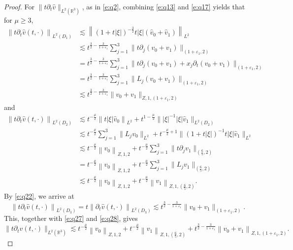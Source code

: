\documentclass[10pt,a4paper]{amsart}
\newcommand{\R}{\mathbb R}
\newcommand{\f}{\frac}
\newcommand{\p}{\partial}
\begin{document}
\begin{proof}
For $\|t\p_t\hat{v}\|_{L^2(\R^3)}$, as in \eqref{e:q2}, combining \eqref{e:q13} and \eqref{e:q17} yields that for $\mu\geq3$,
\begin{equation}\label{e:q27}
\begin{aligned}
\left\|t\p_t\hat{v}(t, \cdot)\right\|_{L^2(D_1)}  &\lesssim\left\|(1+t|\xi|)^{-\f32}t|\xi|(\hat{v}_{0}+\hat{v}_{1})\right\|_{L^{2}}\\
& \lesssim t^{\f32-\f{3}{1+\varepsilon_1}}\sum_{j=1}^{3}\|t\p_j(v_0+v_1)\|_{(1+\varepsilon_1, 2)}\\
& = t^{\f32-\f{3}{1+\varepsilon_1}}\sum_{j=1}^{3}\|t\p_j(v_0+v_1)+x_j\p_t(v_0+v_1)\|_{(1+\varepsilon_1, 2)}\\
& = t^{\f32-\f{3}{1+\varepsilon_1}}\sum_{j=1}^{3}\|L_j(v_0+v_1)\|_{(1+\varepsilon_1, 2)}\\
& \lesssim t^{\f32-\f{3}{1+\varepsilon_1}}\|v_0+v_1\|_{Z,1, (1+\varepsilon_1, 2)}
\end{aligned}
\end{equation}
and
\begin{equation}\label{e:q28}
\begin{aligned}
\left\|t\p_t\hat{v}(t, \cdot)\right\|_{L^2(D_2)}
& \lesssim t^{-\frac{\mu}{2}}\left\|t|\xi|\hat{v}_{0}\right\|_{L^{2}}+t^{1-\f{\mu}{2}} \||\xi|^{-1}|\xi|\hat{v}_{1}\|_{L^{2}(D_2)}\\
& \lesssim t^{-\frac{\mu}{2}}\sum_{j=1}^{3}\|L_jv_0\|_{L^2}+t^{-\frac{\mu}{2}+1} \|(1+t|\xi|)^{-1}t|\xi|\hat{v}_{1}\|_{L^{2}}\\
& \lesssim t^{-\frac{\mu}{2}}\left\|v_{0}\right\|_{Z, 1, 2}+ t^{-\frac{\mu}{2}}\sum_{j=1}^{3}\|t\p_jv_1\|_{(\f65, 2)} \\
&=t^{-\frac{\mu}{2}}\left\|v_{0}\right\|_{Z, 1, 2}+ t^{-\frac{\mu}{2}}\sum_{j=1}^{3}\|L_jv_1\|_{(\f65, 2)}\\
& \lesssim  t^{-\frac{\mu}{2}}\left\|v_{0}\right\|_{Z, 1, 2}+ t^{-\frac{\mu}{2}}\left\|v_1\right\|_{Z, 1,(\f65, 2)}.
\end{aligned}
\end{equation}
By \eqref{e:q22}, we arrive at
\begin{equation}\label{e:q29}
\left\|t\p_t\hat{v}(t, \cdot)\right\|_{L^2(D_3)}=t\left\|\p_t\hat{v}(t, \cdot)\right\|_{L^2(D_3)} \lesssim t^{\f32-\f{3}{1+\varepsilon_1}}\|v_0+v_1\|_{(1+\varepsilon_1, 2)}.
\end{equation}
This, together with \eqref{e:q27} and \eqref{e:q28}, gives
\begin{equation}\label{e:q30}
\|t\p_tv(t, \cdot)\|_{L^2(\R^3)} \lesssim t^{-\f{\mu}{2}}\left\|v_0\right\|_{Z, 1, 2}+t^{-\f{\mu}{2}}\left\|v_1\right\|_{Z, 1,(\f65, 2)}+t^{\f32-\f{3}{1+\varepsilon_1}}\left\|v_0+v_1\right\|_{Z, 1,(1+\varepsilon_1, 2)}.
\end{equation}



\end{proof}
\end{document}
